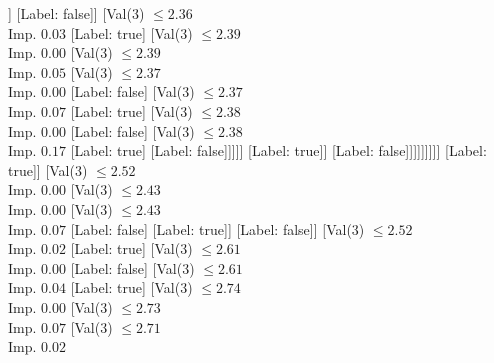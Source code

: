 \documentclass[margin=10pt]{standalone}
\begin{document}
\begin{forest}
																	[Label: false]
																	[Val($3$) $ \leq 2.32$ \\ Imp. $0.02$
																		[Label: true]
																		[Val($3$) $ \leq 2.36$ \\ Imp. $0.00$
																			[Val($3$) $ \leq 2.33$ \\ Imp. $0.01$
																				[Val($3$) $ \leq 2.33$ \\ Imp. $0.22$
																					[Label: false]
																					[Label: true]]
																				[Label: false]]
																			[Val($3$) $ \leq 2.36$ \\ Imp. $0.03$
																				[Label: true]
																				[Val($3$) $ \leq 2.39$ \\ Imp. $0.00$
																					[Val($3$) $ \leq 2.39$ \\ Imp. $0.05$
																						[Val($3$) $ \leq 2.37$ \\ Imp. $0.00$
																							[Label: false]
																							[Val($3$) $ \leq 2.37$ \\ Imp. $0.07$
																								[Label: true]
																								[Val($3$) $ \leq 2.38$ \\ Imp. $0.00$
																									[Label: false]
																									[Val($3$) $ \leq 2.38$ \\ Imp. $0.17$
																										[Label: true]
																										[Label: false]]]]]
																						[Label: true]]
																					[Label: false]]]]]]]]]
													[Label: true]]
												[Val($3$) $ \leq 2.52$ \\ Imp. $0.00$
													[Val($3$) $ \leq 2.43$ \\ Imp. $0.00$
														[Val($3$) $ \leq 2.43$ \\ Imp. $0.07$
															[Label: false]
															[Label: true]]
														[Label: false]]
													[Val($3$) $ \leq 2.52$ \\ Imp. $0.02$
														[Label: true]
														[Val($3$) $ \leq 2.61$ \\ Imp. $0.00$
															[Label: false]
															[Val($3$) $ \leq 2.61$ \\ Imp. $0.04$
																[Label: true]
																[Val($3$) $ \leq 2.74$ \\ Imp. $0.00$
																	[Val($3$) $ \leq 2.73$ \\ Imp. $0.07$
																		[Val($3$) $ \leq 2.71$ \\ Imp. $0.02$

\end{forest}
\end{document}
